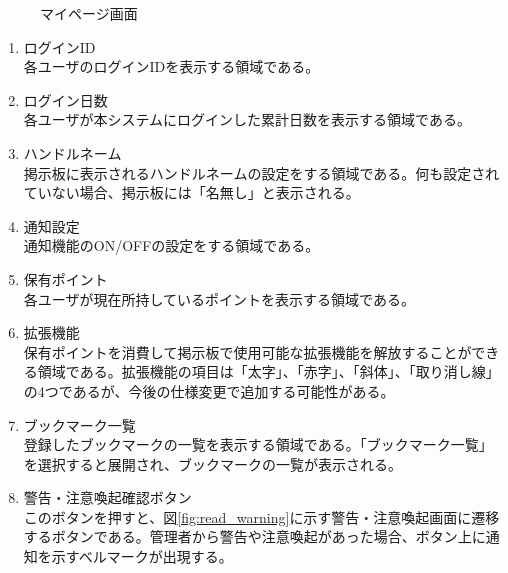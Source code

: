 \documentclass[a4j]{jarticle}
\begin{document}
\begin{figure}[H]
\centering
{}
\caption{マイページ画面}
\label{fig:mypage}
\end{figure}

\begin{enumerate}
  \renewcommand{\labelenumi}{\textcircled{\scriptsize \theenumi}}

  \item ログインID\\
  各ユーザのログインIDを表示する領域である。
  \item ログイン日数\\
  各ユーザが本システムにログインした累計日数を表示する領域である。
  \item ハンドルネーム\\
  掲示板に表示されるハンドルネームの設定をする領域である。何も設定されていない場合、掲示板には「名無し」と表示される。
  \item 通知設定\\
  通知機能のON/OFFの設定をする領域である。
  \item 保有ポイント\\
  各ユーザが現在所持しているポイントを表示する領域である。
  \item 拡張機能\\
  保有ポイントを消費して掲示板で使用可能な拡張機能を解放することができる領域である。拡張機能の項目は「太字」、「赤字」、「斜体」、「取り消し線」の4つであるが、今後の仕様変更で追加する可能性がある。
  \item ブックマーク一覧\\
  登録したブックマークの一覧を表示する領域である。「ブックマーク一覧」を選択すると展開され、ブックマークの一覧が表示される。
  \item 警告・注意喚起確認ボタン\\
  このボタンを押すと、図\ref{fig:read_warning}に示す警告・注意喚起画面に遷移するボタンである。管理者から警告や注意喚起があった場合、ボタン上に通知を示すベルマークが出現する。
\end{enumerate}
\end{document}
